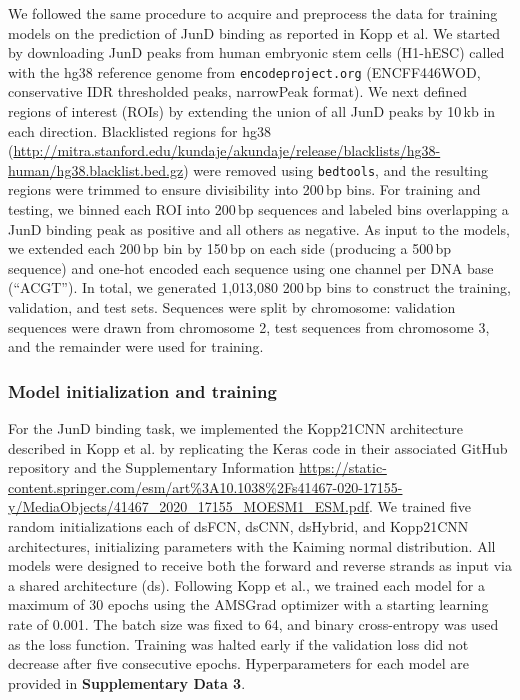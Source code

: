 We followed the same procedure to acquire and preprocess the data for training models on the prediction of JunD binding as reported in Kopp et al.\cite{Kopp2020-fw} We started by downloading JunD peaks from human embryonic stem cells (H1-hESC) called with the hg38 reference genome from \texttt{encodeproject.org} (ENCFF446WOD, conservative IDR thresholded peaks, narrowPeak format). We next defined regions of interest (ROIs) by extending the union of all JunD peaks by 10\,kb in each direction. Blacklisted regions for hg38 (\url{http://mitra.stanford.edu/kundaje/akundaje/release/blacklists/hg38-human/hg38.blacklist.bed.gz}) were removed using \texttt{bedtools}\cite{Quinlan2010-ei}, and the resulting regions were trimmed to ensure divisibility into 200\,bp bins. For training and testing, we binned each ROI into 200\,bp sequences and labeled bins overlapping a JunD binding peak as positive and all others as negative. As input to the models, we extended each 200\,bp bin by 150\,bp on each side (producing a 500\,bp sequence) and one-hot encoded each sequence using one channel per DNA base (``ACGT''). In total, we generated 1,013,080 200\,bp bins to construct the training, validation, and test sets. Sequences were split by chromosome: validation sequences were drawn from chromosome 2, test sequences from chromosome 3, and the remainder were used for training.

\subsubsection{Model initialization and training}

For the JunD binding task, we implemented the Kopp21CNN architecture described in Kopp et al. by replicating the Keras code in their associated GitHub repository and the Supplementary Information \url{https://static-content.springer.com/esm/art%3A10.1038%2Fs41467-020-17155-y/MediaObjects/41467_2020_17155_MOESM1_ESM.pdf}. We trained five random initializations each of dsFCN, dsCNN, dsHybrid, and Kopp21CNN architectures, initializing parameters with the Kaiming normal distribution.\cite{He2015-qh} All models were designed to receive both the forward and reverse strands as input via a shared architecture (ds). Following Kopp et al., we trained each model for a maximum of 30 epochs using the AMSGrad optimizer\cite{Phuong2019-dz} with a starting learning rate of 0.001. The batch size was fixed to 64, and binary cross-entropy was used as the loss function. Training was halted early if the validation loss did not decrease after five consecutive epochs. Hyperparameters for each model are provided in \textbf{Supplementary Data 3}.

